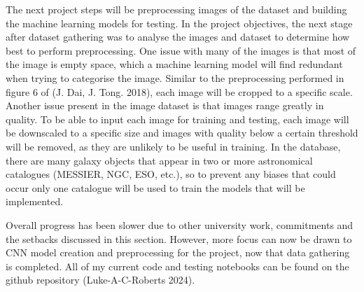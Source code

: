 \documentclass[12pt,runningheads]{llncs}
\begin{document}
\noindent The next project steps will be preprocessing images of the dataset and building the machine
learning models for testing. In the project objectives, the next stage after dataset gathering
was to analyse the images and dataset to determine how best to perform preprocessing. 
One issue with many of the images is that most of the image is empty space, which a machine 
learning model will find redundant when trying to categorise the image. Similar to the 
preprocessing performed in figure 6 of (J. Dai, J. Tong. 2018), each image will be cropped 
to a specific scale. Another issue present in the image dataset is that images range greatly 
in quality. To be able to input each image for training and testing, each image will be 
downscaled to a specific size and images with quality below a certain threshold will be removed, 
as they are unlikely to be useful in training. In the database, there are many galaxy objects 
that appear in two or more astronomical catalogues (MESSIER, NGC, ESO, etc.), so to prevent 
any biases that could occur only one catalogue will be used to train the models that will be 
implemented.

\newpage
\noindent Overall progress has been slower due to other university work, commitments and the setbacks 
discussed in this section. However, more focus can now be drawn to CNN model creation and 
preprocessing for the project, now that data gathering is completed. All of my current code
and testing notebooks can be found on the github repository (Luke-A-C-Roberts 2024).


\end{document}
